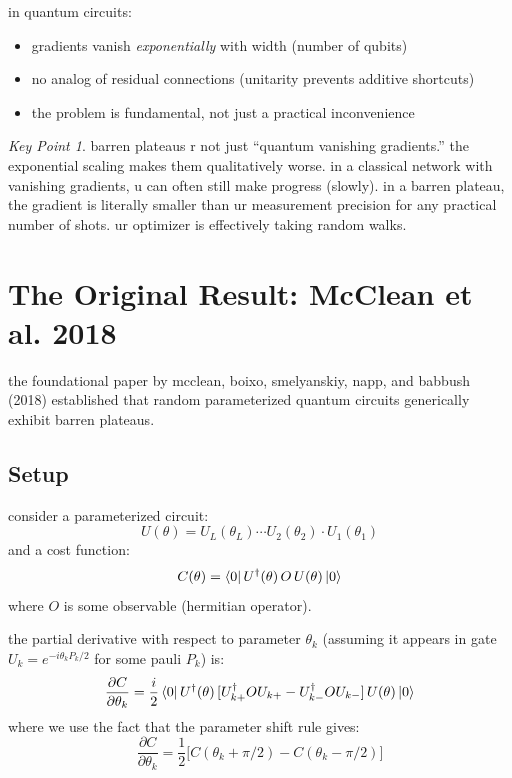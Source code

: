 \documentclass[11pt,a4paper]{article}
\theoremstyle{definition}
\theoremstyle{remark}
\newtheorem*{keypoint}{Key Point}
\begin{document}
in quantum circuits:
\begin{itemize}
    \item gradients vanish \emph{exponentially} with width (number of qubits)
    \item no analog of residual connections (unitarity prevents additive shortcuts)
    \item the problem is fundamental, not just a practical inconvenience
\end{itemize}

\begin{keypoint}
barren plateaus r not just ``quantum vanishing gradients.'' the exponential scaling makes them qualitatively worse. in a classical network with vanishing gradients, u can often still make progress (slowly). in a barren plateau, the gradient is literally smaller than ur measurement precision for any practical number of shots. ur optimizer is effectively taking random walks.
\end{keypoint}

\section{The Original Result: McClean et al. 2018}

the foundational paper by mcclean, boixo, smelyanskiy, napp, and babbush (2018) established that random parameterized quantum circuits generically exhibit barren plateaus.

\subsection{Setup}

consider a parameterized circuit:
\begin{equation}
    U(\theta) = U_L(\theta_L) \cdots U_2(\theta_2) \cdot U_1(\theta_1)
\end{equation}
and a cost function:
\begin{equation}
    C(\theta) = \bra{0} U^\dagger(\theta) \, O \, U(\theta) \ket{0}
\end{equation}
where $O$ is some observable (hermitian operator).

the partial derivative with respect to parameter $\theta_k$ (assuming it appears in gate $U_k = e^{-i\theta_k P_k/2}$ for some pauli $P_k$) is:
\begin{equation}
    \frac{\partial C}{\partial \theta_k} = \frac{i}{2} \bra{0} U^\dagger(\theta) \, [U_{k+}^\dagger O U_{k+} - U_{k-}^\dagger O U_{k-}] \, U(\theta) \ket{0}
\end{equation}
where we use the fact that the parameter shift rule gives:
\begin{equation}
    \frac{\partial C}{\partial \theta_k} = \frac{1}{2}\Big[C(\theta_k + \pi/2) - C(\theta_k - \pi/2)\Big]
\end{equation}
\end{document}
